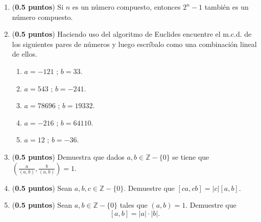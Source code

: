 \documentclass[fontsize=12pt]{scrartcl}
\begin{document}
\begin{enumerate}
                        
		
		\item ({\bf 0.5 puntos}) Si $n$ es un n\'umero compuesto, entonces 
		$2^{n} - 1$ tambi\'en es un n\'umero compuesto.
		

	
		\item ({\bf 0.5 puntos}) Haciendo uso del algoritmo de Euclides encuentre 
		el m.c.d. de los siguientes pares de n\'umeros y luego escr\'ibalo 
		como una combinaci\'on lineal de ellos.
			\begin{enumerate}
				\item $a = -121$ ; $b = 33$.
				\item $a = 543$ ; $b = -241 $.
				\item $a = 78696$ ; $b = 19332$.
				\item $a = -216$ ; $b = 64110$.
				\item $a = 12$ ; $b = -36$.
			\end{enumerate}

	   	 \item ({\bf 0.5 puntos})  Demuestra que dados $a, b \in \mathbb{Z}-\{0\}$ 
		se tiene que $\left( \frac{a}{(a,b)}, \frac{b}{(a,b)} \right ) = 1$.

		\item ({\bf 0.5 puntos}) Sean $a, b, c \in \mathbb{Z}-\{0\}$. Demuestre que 
		$\left[ca, cb\right] = \lvert c \rvert \left[a,b\right]$.
		
		\item ({\bf 0.5 puntos}) Sean $a, b \in \mathbb{Z} - \{0\}$ tales que 
		$\left( a, b \right) = 1$. Demuestre que 
		\[
				\left[a,b\right] = \lvert a \rvert \cdot \lvert b \rvert.
		\]
	\end{enumerate}
	
\end{document}
